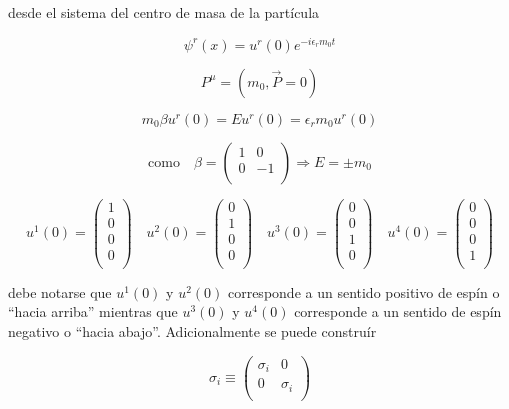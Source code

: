 \documentclass{report}
\begin{document}
desde el sistema del centro de masa de la partícula

\[\psi^{r}(x) = u^{r}(0)e^{-i\epsilon_{r} m_{0}t}\]

\[P^{\mu} = (m_{0}, \overrightarrow{P}=0)\]

\[m_0 \beta u^{r}(0) = E u^{r}(0) = \epsilon_{r}m_0 u^{r}(0)\]



\[\text{como} \quad \beta = \left (\begin{array}{cc}
 1 & 0  \\
 0 & -1  \\
 \end{array} \right) \Rightarrow E = \pm m_0 \]

\[u^1 (0) = \left ( \begin{array}{cccc}
 1   \\
 0   \\
 0   \\
 0   \\
 \end{array} \right) \quad u^2 (0) = \left (\begin{array}{cccc}
 0   \\
 1   \\
 0   \\
 0   \\
 \end{array} \right) \quad u^3 (0) = \left ( \begin{array}{cccc}
 0   \\
 0   \\
 1   \\
 0   \\
 \end{array} \right) \quad u^{4}(0) = \left ( \begin{array}{cccc}
 0   \\
 0   \\
 0   \\
 1   \\
 \end{array} \right) 
 \]

debe notarse que $u^1 (0)$ y $u^2(0)$ corresponde a un sentido positivo de espín o ``hacia arriba'' mientras que $u^3  (0)$ y $u^4 (0)$ corresponde a un sentido de espín negativo o ``hacia abajo''. Adicionalmente se puede construír

\[\sigma_{i} \equiv \left ( \begin{array}{cc}
 \sigma_{i} & 0   \\
 0 & \sigma_{i}  \\
 \end{array} \right) \]
\end{document}
